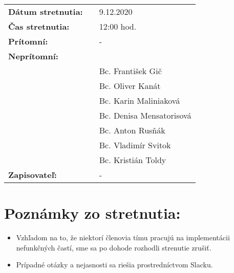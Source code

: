 \documentclass{article}
\begin{document}
    

    \begin{table}[h]
        \begin{tabular}{lllll}
            \multicolumn{3}{l}{\textbf{Dátum stretnutia:}} & & 9.12.2020 \\
            \multicolumn{3}{l}{\textbf{Čas stretnutia:}} & & 12:00 hod. \\
            \multicolumn{3}{l}{\textbf{Prítomní:}} & & -\\
            \multicolumn{3}{l}{\textbf{Neprítomní:}} \\
            & & & & Bc. František Gič  \\
            & & & & Bc. Oliver Kanát \\
            & & & & Bc. Karin Maliniaková \\
            & & & & Bc. Denisa Mensatorisová \\
            & & & & Bc. Anton Rusňák \\
            & & & & Bc. Vladimír Svitok \\
            & & & & Bc. Kristián Toldy \\
            \multicolumn{3}{l}{\textbf{Zapisovateľ:}} & & -\\
        \end{tabular}
        \label{tab:grades}
    \end{table}

    \section*{Poznámky zo stretnutia:}

    \begin{itemize}
        \item Vzhľadom na to, že niektorí členovia tímu pracujú na implementácii nefunkčných častí, sme sa po dohode rozhodli strenutie zrušiť.
        \item Prípadné otázky a nejasnosti sa riešia prostredníctvom Slacku.
    \end{itemize}
\end{document}
